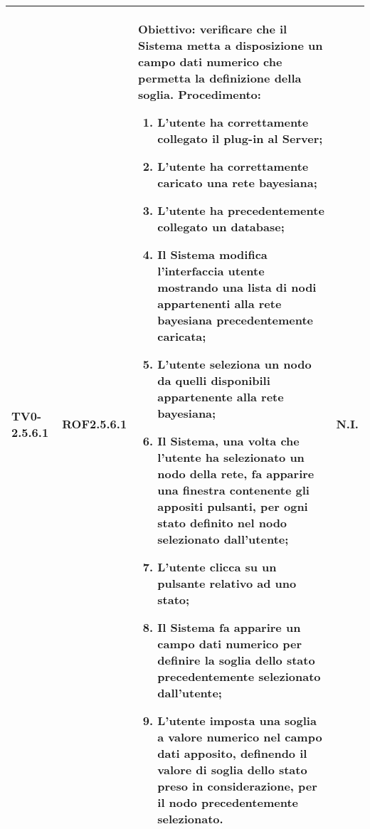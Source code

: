 \begin{longtable}{|C{.15\textwidth}|C{.13\textwidth}|m{.65\textwidth}|C{.08\textwidth}|}
TV0-2.5.6.1 & ROF2.5.6.1 &
	\textbf{Obiettivo}: verificare che il Sistema metta a disposizione un campo dati numerico che permetta la definizione della soglia. \newline
	\textbf{Procedimento}:
	\begin{enumerate}
		\item L'utente ha correttamente collegato il plug-in al Server;
		\item L'utente ha correttamente caricato una rete bayesiana;
		\item L'utente ha precedentemente collegato un database;
		\item Il Sistema modifica l'interfaccia utente mostrando una lista di nodi appartenenti alla rete bayesiana precedentemente caricata;
		\item L'utente seleziona un nodo da quelli disponibili appartenente alla rete bayesiana;
		\item Il Sistema, una volta che l'utente ha selezionato un nodo della rete, fa apparire una finestra contenente gli appositi pulsanti, per ogni stato definito nel nodo selezionato dall'utente;
		\item L'utente clicca su un pulsante relativo ad uno stato;
		\item Il Sistema fa apparire un campo dati numerico per definire la soglia dello stato precedentemente selezionato dall'utente;
		\item L'utente imposta una soglia a valore numerico nel campo dati apposito, definendo il valore di soglia dello stato preso in considerazione, per il nodo precedentemente selezionato.
	\end{enumerate}
	& N.I. \\
\hline


\end{longtable}
